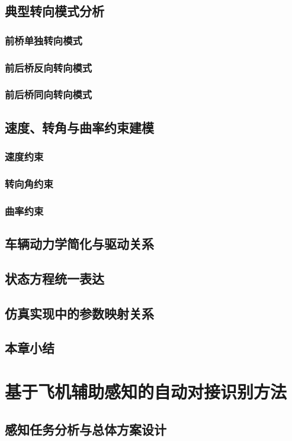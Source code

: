 \documentclass{article}
\begin{document}
\subsection{典型转向模式分析}
\subsubsection{前桥单独转向模式}
\subsubsection{前后桥反向转向模式}
\subsubsection{前后桥同向转向模式}
\subsection{速度、转角与曲率约束建模}
\subsubsection{速度约束}
\subsubsection{转向角约束}
\subsubsection{曲率约束}
\subsection{车辆动力学简化与驱动关系}
\subsection{状态方程统一表达}
\subsection{仿真实现中的参数映射关系}
\subsection{本章小结}

\section{基于飞机辅助感知的自动对接识别方法}
\subsection{感知任务分析与总体方案设计}
\end{document}

